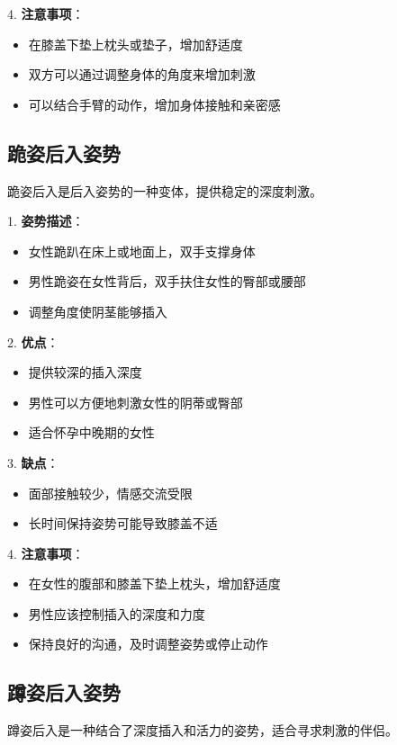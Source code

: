 \documentclass[12pt,UTF8]{ctexbook}
\begin{document}
4. \textbf{注意事项}：
  \begin{itemize}
  \item 在膝盖下垫上枕头或垫子，增加舒适度
  \item 双方可以通过调整身体的角度来增加刺激
  \item 可以结合手臂的动作，增加身体接触和亲密感
  \end{itemize}

\subsection{跪姿后入姿势}

跪姿后入是后入姿势的一种变体，提供稳定的深度刺激。

1. \textbf{姿势描述}：
  \begin{itemize}
  \item 女性跪趴在床上或地面上，双手支撑身体
  \item 男性跪姿在女性背后，双手扶住女性的臀部或腰部
  \item 调整角度使阴茎能够插入
  \end{itemize}

2. \textbf{优点}：
  \begin{itemize}
  \item 提供较深的插入深度
  \item 男性可以方便地刺激女性的阴蒂或臀部
  \item 适合怀孕中晚期的女性
  \end{itemize}

3. \textbf{缺点}：
  \begin{itemize}
  \item 面部接触较少，情感交流受限
  \item 长时间保持姿势可能导致膝盖不适
  \end{itemize}

4. \textbf{注意事项}：
  \begin{itemize}
  \item 在女性的腹部和膝盖下垫上枕头，增加舒适度
  \item 男性应该控制插入的深度和力度
  \item 保持良好的沟通，及时调整姿势或停止动作
  \end{itemize}

\subsection{蹲姿后入姿势}

蹲姿后入是一种结合了深度插入和活力的姿势，适合寻求刺激的伴侣。
\end{document}
